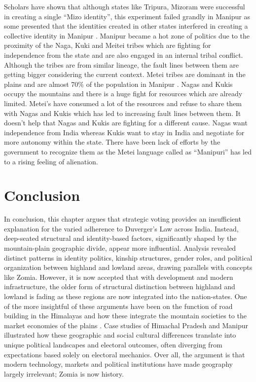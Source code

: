 Scholars have shown that although states like Tripura, Mizoram were successful in creating a single \enquote{Mizo identity}, this experiment failed grandly in Manipur as some presented that the identities created in other states interfered in creating a collective identity in Manipur \citep{hassan2007state}.   Manipur became a hot zone of politics due to the proximity of the Naga, Kuki and Meitei tribes which are fighting for independence from the state and are also engaged in an internal tribal conflict. Although the tribes are from similar lineage, the fault lines between them are getting bigger considering the current context. Metei tribes are dominant in the plains and are almost 70\% of the population in Manipur \citep{arora2012politics}. Nagas and Kukis occupy the mountains and there is a huge fight for resources which are already limited. Metei’s have consumed a lot of the resources and refuse to share them with Nagas and Kukis which has led to increasing fault lines between them. It doesn't help that Nagas and Kukis are fighting for a different cause. Nagas want independence from India whereas Kukis want to stay in India and negotiate for more autonomy within the state. There have been lack of efforts by the government to recognize them as the Metei language called as \enquote{Manipuri} has led to a rising feeling of alienation.

\section{Conclusion}

In conclusion, this chapter argues that strategic voting provides an insufficient explanation for the varied adherence to Duverger's Law across India. Instead, deep-seated structural and identity-based factors, significantly shaped by the mountain-plain geographic divide, appear more influential. Analysis revealed distinct patterns in identity politics, kinship structures, gender roles, and political organization between highland and lowland areas, drawing parallels with concepts like Zomia. However, it is now accepted that with development and modern infrastructure, the older form of structural distinction between highland and lowland is fading as these regions are now integrated into the nation-states. One of the more insightful of these arguments have been on the function of road building in the Himalayas and how these integrate the mountain societies to the market economies of the plains \citep{murton2013himalayan}.
Case studies of Himachal Pradesh and Manipur illustrated how these geographic and social cultural differences translate into unique political landscapes and electoral outcomes, often diverging from expectations based solely on electoral mechanics. Over all, the argument is that modern technology, markets and political institutions have made geography largely irrelevant; Zomia is now history. 

